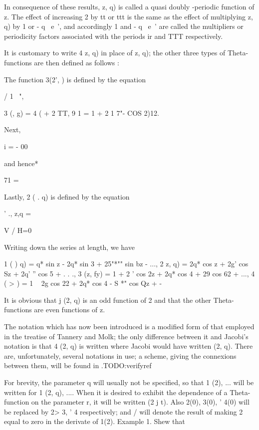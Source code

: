 In consequence of these results, z, q) is called a quasi doubly
-periodic function of z. The effect of increasing 2 by tt or ttt is
the same as the effect of multiplying z, q) by 1 or - q~ e~', and
accordingly 1 and - q~ e~' are called the multipliers or periodicity
factors associated with the periods ir and TTT respectively.


It is customary to write 4 z, q) in place of z, q); the other three
types of Theta-functions are then defined as follows :

%
%

The function 3(2', ) is defined by the equation

/ 1 \ ",

 3 (, g) = 4 ( + 2 TT, 9 1 = 1 + 2 1 7"- COS 2)12.

Next, %

 i = - 00

and hence* %

71 =

Lastly, 2 ( . q) is defined by the equation

' ., z,q = %

V / H=0

Writing down the series at length, we have

 1 ( ) q) = q* sin z - 2q* sin 3 + 25"*"" sin bz - ..., 2 z, q) = 2q*
cos z + 2g' cos Sz + 2q' '' cos 5 + . . ., 3 (z, fy) = 1 + 2 ' cos 2z
+ 2q* cos 4 + 29 cos 62 + ..., 4 ( > ) = 1 ~ 2g cos 22 + 2q* cos 4 -
S *" cos Qz + -

It is obvious that j (2, q) is an odd function of 2 and that the other
Theta-functions are even functions of z.

The notation which has now been introduced is a modified form of that
employed in the treatise of Tannery and Molk; the only difference
between it and Jacobi's notation is that 4 (2, q) is written where
Jacobi would have written (2, q). There are, unfortunately, several
notations in use; a scheme, giving the connexions between them, will
be found in .TODO:verifyref

For brevity, the parameter q will usually not be specified, so that 1
(2), ... will be written for 1 (2, q), .... When it is desired to
exhibit the dependence of a Theta-function on the parameter r, it will
be written (2 j t). Also 2(0), 3(0), ' 4(0) will be replaced by 2> 3,
' 4 respectively; and / will denote the result of making 2 equal to
zero in the derivate of 1(2). Example 1. Shew that

